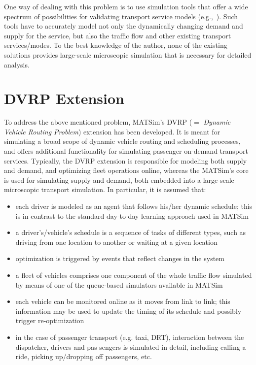 One way of dealing with this problem is to use simulation tools that offer a wide spectrum of possibilities for validating transport service models (e.g.,\,\cite{ReganMahmassaniJaillet1998DynamicFleetManagementSimulation, BarceloEtc2007RoutingSchedulingSimulationLogistics, LiaoEtc2008ObjOrFramework4DVRP} ).
%
Such tools have to accurately model not only the dynamically changing demand and supply for the service, but also the traffic flow and other existing transport services/modes. To the best knowledge of the author, none of the existing solutions provides large-scale microscopic simulation that is necessary for detailed analysis. 



\section{DVRP Extension}

To address the above mentioned problem, MATSim's DVRP ($=$ \emph{Dynamic Vehicle Routing Problem}) extension has been developed. It is meant for simulating a broad scope of dynamic vehicle routing and scheduling processes, and offers additional functionality for simulating passenger on-demand transport services. Typically, the DVRP extension is responsible for modeling both supply and demand, and optimizing fleet operations online, whereas the MATSim's core is used for simulating supply and demand, both embedded into a large-scale microscopic transport simulation. In particular, it is assumed that:
%
\begin{itemize}
	\item each driver is modeled as an agent that follows his/her dynamic schedule; this is in contrast to the standard day-to-day learning approach used in MATSim

	\item a driver’s/vehicle’s schedule is a sequence of tasks of different types, such as driving from one location to another or waiting at a given location

	\item optimization is triggered by events that reflect changes in the system

	\item a fleet of vehicles comprises one component of the whole traffic flow simulated by means of one of the queue-based simulators available in MATSim

	\item each vehicle can be monitored online as it moves from link to link; this information may be used to update the timing of its schedule and possibly trigger re-optimization

	\item in the case of passenger transport (e.g. taxi, DRT), interaction between the dispatcher, drivers and pas-sengers is simulated in detail, including calling a ride, picking up/dropping off passengers, etc.
\end{itemize}


